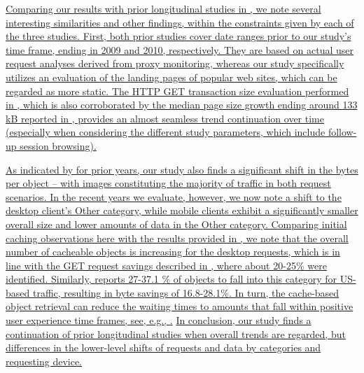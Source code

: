 \documentclass[onecolumn,12pt]{IEEEtran}
\begin{document}
%
%
\uline{Comparing our results with prior longitudinal studies in \cite{CaAlPa10,IhPa11}, we note several interesting similarities and other findings, within the constraints given by each of the three studies.
First, both prior studies cover date ranges prior to our study's time frame, ending in 2009 and 2010, respectively. They are based on actual user request analyses derived from proxy monitoring, whereas our study specifically utilizes an evaluation of the landing pages of popular web sites, which can be regarded as more static.
The HTTP GET transaction size evaluation performed in \cite{CaAlPa10}, which is also corroborated by the median page size growth ending around 133 kB reported in \cite{IhPa11}, provides an almost seamless trend continuation over time (especially when considering the different study parameters, which include follow-up session browsing).}

\uline{As indicated by \cite{IhPa11} for prior years, our study also finds a significant shift in the bytes per object -- with  images constituting the majority of traffic in both request scenarios.
In the recent years we evaluate, however, we now note a shift to the desktop client's Other category, while mobile clients exhibit a significantly smaller overall size and lower amounts of data in the Other category.
Comparing initial caching observations here with the results provided in  \cite{CaAlPa10,IhPa11}, we note that the overall number of cacheable objects is increasing for the desktop requests, which is in line with the GET request savings described in \cite{CaAlPa10}, where about 20-25\% were identified.
Similarly, \cite{IhPa11} reports 27-37.1 \% of objects to fall into this category for US-based traffic, resulting in byte savings of 16.8-28.1\%.
In turn,  the cache-based object retrieval can reduce the waiting times to amounts that fall within positive user experience time frames, see, e.g., \cite{NiUeNa10}.}
\uline{In conclusion, our study finds a continuation of prior longitudinal studies when overall trends are regarded, but differences in the lower-level shifts of requests and data by categories and requesting device.}
\end{document}
